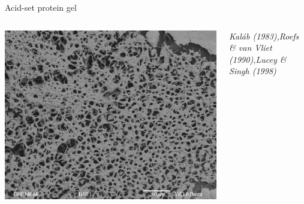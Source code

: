 \documentclass[xcolor=table]{beamer}
\begin{document}
\begin{frame}{Acid-set protein gel}
\begin{columns}
\includegraphics[width=\textwidth, clip=true, trim=0 0 0 10cm]{MEB_cas4_gdl1_22}

\begin{scriptsize}
\textit{Kaláb (1983),\linebreak Roefs \& van Vliet (1990),\linebreak Lucey \& Singh (1998)}
\end{scriptsize}
\end{columns}
\end{frame}
\end{document}
